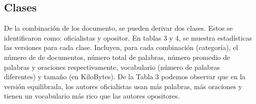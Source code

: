 \documentclass[a4paper,10pt]{article}
\begin{document}
\newpage
\subsection{Clases}

De la combinación de los documento, se pueden derivar dos clases. Estos se identificaron como: oficialistas y opositor. En tablas 3 y 4, se muestra estadísticas las versiones para cada clase. Incluyen, para cada combinación (categoría), el número de de documentos, número total de palabras, número promedio de palabras y oraciones respectivamente, vocabulario (número de palabras diferentes) y tamaño (en KiloBytes). De la Tabla 3 podemos observar que en la versión equilibrada, los autores oficialistas usan más palabras, más oraciones y tienen un vocabulario más rico que las autores opositores.
 
\end{document}
